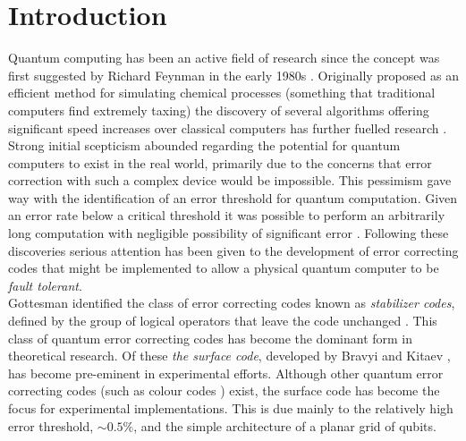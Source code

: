 
\chapter{Introduction}
Quantum computing has been an active field of research since the concept was first suggested by Richard Feynman in the early 1980s \cite{Feynman1982}.
Originally proposed as an efficient method for simulating chemical processes (something that traditional computers find extremely taxing) the discovery of several algorithms offering significant speed increases over classical computers has further fuelled research \cite{Shor1994,Shor1997}.
Strong initial scepticism abounded regarding the potential for quantum computers to exist in the real world, primarily due to the concerns that error correction with such a complex device would be impossible\cite{Preskill1997}.
This pessimism gave way with the identification of an error threshold for quantum computation.
Given an error rate below a critical threshold it was possible to perform an arbitrarily long computation with negligible possibility of significant error \cite{Shor1996,Aharonov1997}.
Following these discoveries serious attention has been given to the development of error correcting codes that might be implemented to allow a physical quantum computer to be \emph{fault tolerant}.
\\
Gottesman identified the class of error correcting codes known as \emph{stabilizer codes}, defined by the group of logical operators that leave the code unchanged \cite{Gottesman1997a}.
This class of quantum error correcting codes has become the dominant form in theoretical research.
Of these \emph{the surface code}, developed by Bravyi and Kitaev \cite{Bravyi1998}, has become pre-eminent in experimental efforts.
Although other quantum error correcting codes (such as colour codes \cite{Vasmer2018}) exist, the surface code has become the focus for experimental implementations. This is due mainly to the relatively high error threshold, $\sim0.5\%$, and the simple architecture of a planar grid of qubits.
